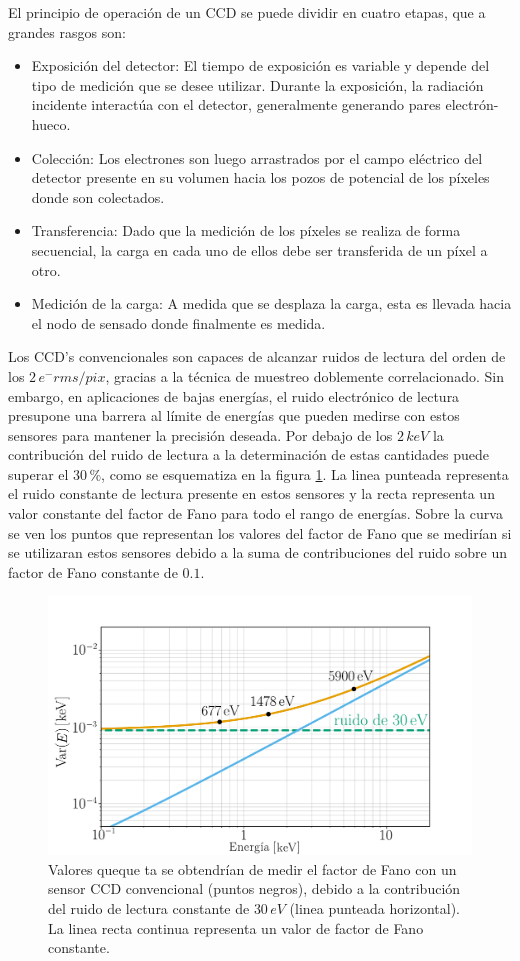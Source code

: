 \indent El principio de operación de un CCD se puede dividir en cuatro etapas, que a grandes rasgos son:
\begin{itemize}
    \item Exposición del detector: El tiempo de exposición es variable y depende del tipo de medición que se desee utilizar. Durante la exposición, la radiación incidente interactúa con el detector, generalmente generando pares electrón-hueco. 
    \item Colección: Los electrones son luego arrastrados por el campo eléctrico del detector presente en su volumen hacia los pozos de potencial de los píxeles donde son colectados.
    \item Transferencia: Dado que la medición de los píxeles se realiza de forma secuencial, la carga en cada uno de ellos debe ser transferida de un píxel a otro.
    \item Medición de la carga: A medida que se desplaza la carga, esta es llevada hacia el nodo de sensado donde finalmente es medida.
\end{itemize}
Los CCD's convencionales son capaces de alcanzar ruidos de lectura del orden de los $2\,e^{-}\si{rms/pix}$, gracias a la técnica de muestreo doblemente correlacionado\cite{Tiffenberg}. Sin embargo, en aplicaciones de bajas energías, el ruido electrónico de lectura presupone una barrera al límite de energías que pueden medirse con estos sensores para mantener la precisión deseada. Por debajo de los $2\,\si{keV}$ la contribución del ruido de lectura a la determinación de estas cantidades puede superar el $30\,\%$, como se esquematiza en la figura \ref{fig:Fano_y_ruido}. La linea punteada representa el ruido constante de lectura presente en estos sensores y la recta representa un valor constante del factor de Fano para todo el rango de energías. Sobre la curva se ven los puntos que representan los valores del factor de Fano que se medirían si se utilizaran estos sensores debido a la suma de contribuciones del ruido sobre un factor de Fano constante de $0.1$.
\begin{figure}[H]
    \centering
        \includegraphics[scale=.5]{Figs/fano_y_ruido.pdf}
    \caption{\footnotesize{Valores queque ta se obtendrían de medir el factor de Fano con un sensor CCD convencional (puntos negros), debido a la contribución del ruido de lectura constante de $30\,\si{eV}$ (linea punteada horizontal). La linea recta continua representa un valor de factor de Fano constante.}}
    \label{fig:Fano_y_ruido}
\end{figure}
